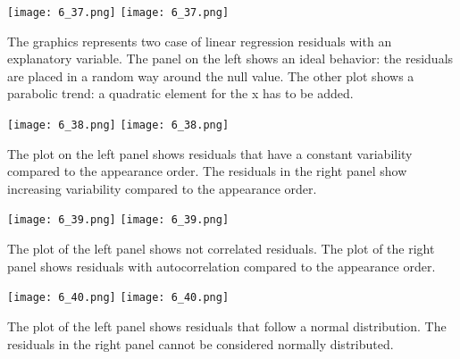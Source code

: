 \begin{frame}
  \vspace*{-.5cm}
  \begin{center}
      {\texttt{[image: 6\_37.png]}}
      {\texttt{[image: 6\_37.png]}}
  \end{center}
  \vspace*{-.3cm}
  The graphics represents two case of linear regression residuals with an explanatory variable. The panel on the left shows an ideal behavior: the residuals are placed in a random way around the null value. The other plot shows a parabolic trend: a quadratic element for the x has to be added.
\end{frame}

\begin{frame}
  \begin{center}
      {\texttt{[image: 6\_38.png]}}
      {\texttt{[image: 6\_38.png]}}
  \end{center}
  The plot on the left panel shows residuals that have a constant variability compared to the appearance order. The residuals in the right panel show increasing variability compared to the appearance order.
\end{frame}

\begin{frame}
  \begin{center}
      {\texttt{[image: 6\_39.png]}}
      {\texttt{[image: 6\_39.png]}}
  \end{center}
  The plot of the left panel shows not correlated residuals. The plot of the right panel shows residuals with autocorrelation compared to the appearance order.
\end{frame}

\begin{frame}
  \begin{center}
      {\texttt{[image: 6\_40.png]}}
      {\texttt{[image: 6\_40.png]}}
  \end{center}
  The plot of the left panel shows residuals that follow a normal distribution. The residuals in the right panel cannot be considered normally distributed.
\end{frame}

